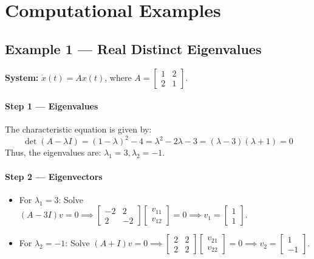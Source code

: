 \documentclass[11pt,a4paper]{article}
\begin{document}
\section{Computational Examples}

\subsection{Example 1 --- Real Distinct Eigenvalues}
\textbf{System:} $\dot{x}(t) = Ax(t)$, where $A = \begin{bmatrix} 1 & 2 \\ 2 & 1 \end{bmatrix}$.

\paragraph{Step 1 --- Eigenvalues}
The characteristic equation is given by:
\begin{equation*}
\det(A - \lambda I) = (1-\lambda)^2 - 4 = \lambda^2 - 2\lambda - 3 = (\lambda-3)(\lambda+1) = 0
\end{equation*}
Thus, the eigenvalues are: $\lambda_1 = 3, \lambda_2 = -1$.

\paragraph{Step 2 --- Eigenvectors}
\begin{itemize}
    \item For $\lambda_1 = 3$: Solve $(A-3I)v = 0 \implies \begin{bmatrix} -2 & 2 \\ 2 & -2 \end{bmatrix} \begin{bmatrix} v_{11} \\ v_{12} \end{bmatrix} = 0 \implies v_1 = \begin{bmatrix} 1 \\ 1 \end{bmatrix}$.
    \item For $\lambda_2 = -1$: Solve $(A+I)v = 0 \implies \begin{bmatrix} 2 & 2 \\ 2 & 2 \end{bmatrix} \begin{bmatrix} v_{21} \\ v_{22} \end{bmatrix} = 0 \implies v_2 = \begin{bmatrix} 1 \\ -1 \end{bmatrix}$.
\end{itemize}
\end{document}
